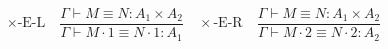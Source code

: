 \documentclass{article}
\begin{document}
\setlength\abovedisplayskip{0pt} %


\begin{preview}
\color[rgb]{0.000,0.000,0.004}\setcounter{equation}{0}%
\[\times\text{-E-L} \quad \frac{\Gamma \vdash M \equiv N : A_1 \times A_2}{\Gamma \vdash M \cdot 1 \equiv N \cdot 1 : A_1}
\quad
\times\text{-E-R} \quad \frac{\Gamma \vdash M \equiv N : A_1 \times A_2}{\Gamma \vdash M \cdot 2 \equiv N \cdot 2 : A_2}\]
\end{preview}
\end{document}
